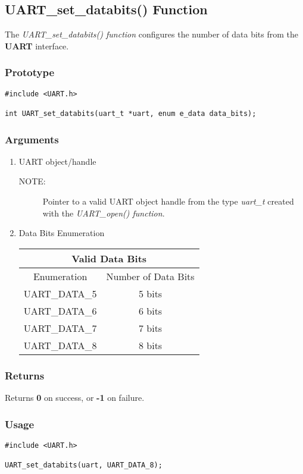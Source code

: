 \documentclass{report}
\begin{document}
\subsection{UART\_set\_databits() Function}
The \textit{UART\_set\_databits() function} configures the number
of data bits from the \textbf{UART} interface.
\subsubsection*{Prototype}
\begin{lstlisting}
#include <UART.h>

int UART_set_databits(uart_t *uart, enum e_data data_bits);
\end{lstlisting}
\subsubsection*{Arguments}
\begin{enumerate}
\item UART object/handle
\begin{description}
\item[NOTE:] Pointer to a valid UART object handle from the type \textit{uart\_t}
created with the \textit{UART\_open() function}.
\end{description}
\item Data Bits Enumeration
\newline
\newline
\begin{tabular}{| c | c |}
\hline
\multicolumn{2}{|c|}{Valid Data Bits} \\
\hline
Enumeration & Number of Data Bits \\
\hline
UART\_DATA\_5 & 5 bits \\
UART\_DATA\_6 & 6 bits \\
UART\_DATA\_7 & 7 bits \\
UART\_DATA\_8 & 8 bits \\
\hline
\end{tabular}
\end{enumerate}
\subsubsection*{Returns}
Returns \textbf{0} on success, or \textbf{-1} on failure.
\subsubsection*{Usage}
\begin{lstlisting}
#include <UART.h>

UART_set_databits(uart, UART_DATA_8);
\end{lstlisting}
\end{document}
